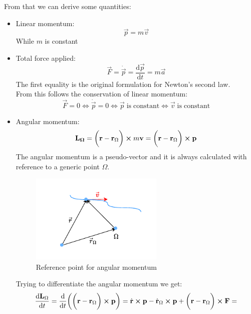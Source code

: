 From that we can derive some quantities:
\begin{itemize}
    \item Linear momentum: \begin{equation}\vec{p}=m\vec{v}\end{equation} While $m$ is constant
    \item Total force applied: \begin{equation}\vec{F}=\dot{\vec{p}}=\dfrac{\mathrm{d} \vec{p}}{\mathrm{d} t}=m\vec{a}\end{equation}The first equality is the original formulation for Newton's second law.\\From this follows the conservation of linear momentum:
    \begin{equation}\vec{F}=0 \iff\dot{\vec{p}}=0 \iff\vec{p}\;\mathrm{is\;constant} \iff\vec{v}\;\mathrm{is\;constant}\end{equation}
    \item Angular momentum:
    \begin{equation}
        \vb{L_{\Omega}} = \bigg(\vb{r}-\vb{r}_{\Omega}\bigg) \cross m\vb{v} = \bigg(\vb{r}-\vb{r}_{\Omega}\bigg) \cross \vb{p}
    \end{equation}
    The angular momentum is a pseudo-vector and it is always calculated with reference to a generic point $\Omega$.
    \begin{figure}[H]
        \centering
        \includegraphics[width=0.6\textwidth]{res/svg/omegareference.drawio}
        \caption{Reference point for angular momentum}
        \label{fig:image2}
    \end{figure}
    Trying to differentiate the angular momentum we get:
    \begin{equation}
      \begin{split}
        \dfrac{\mathrm{d}\vec{L}_{\Omega}}{\mathrm{d}t} &= \dfrac{\mathrm{d}}{\mathrm{d}t}\bbrackets{\bbrackets{\vec{r}-\vec{r}_{\Omega}} \cross \vec{p}} = \dot{\vec{r}}\cross\vec{p} - \dot{\vec{r}}_{\Omega}\cross\vec{p} + \bbrackets{\vec{r}-\vec{r}_{\Omega}} \cross \vec{F} = \\[8pt]

\end{split}
\end{equation}
\end{itemize}
